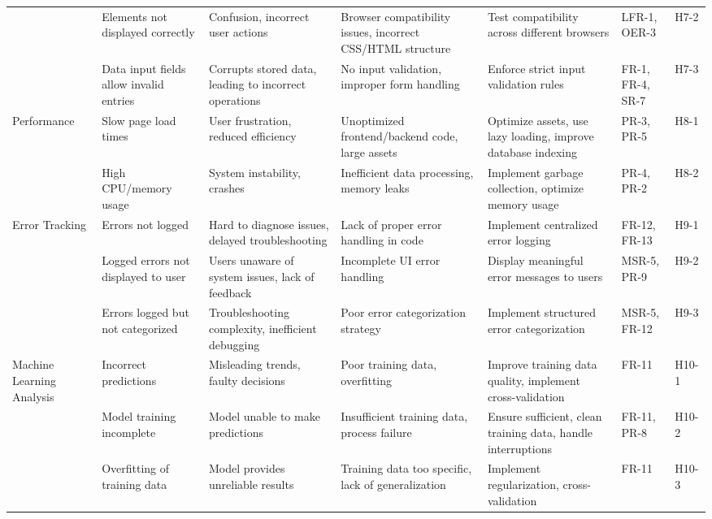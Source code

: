 \documentclass{article}
\begin{document}
\begin{landscape}
\begin{longtable}{|p{2.5cm}|p{4cm}|p{4cm}|p{4cm}|p{4cm}|p{1.25cm}|p{1cm}|}
      \cline{2-7}
      \texttt{} & Elements not displayed correctly & Confusion, incorrect user
      actions & Browser compatibility issues, incorrect CSS/HTML structure &
      Test compatibility across different browsers & LFR-1, OER-3 & H7-2 \\
      \cline{2-7}
      \texttt{} & Data input fields allow invalid entries & Corrupts stored
      data, leading to incorrect operations & No input validation, improper form
      handling & Enforce strict input validation rules & FR-1, FR-4, SR-7 & H7-3
      \\
      \cline{1-7}
      Performance & Slow page load times & User frustration, reduced efficiency
      & Unoptimized frontend/backend code, large assets & Optimize assets, use
      lazy loading, improve database indexing & PR-3, PR-5 & H8-1 \\
      \cline{2-7}
      \texttt{} & High CPU/memory usage & System instability, crashes &
      Inefficient data processing, memory leaks & Implement garbage collection,
      optimize memory usage & PR-4, PR-2 & H8-2 \\
      \cline{1-7}
      Error Tracking & Errors not logged & Hard to diagnose issues, delayed
      troubleshooting & Lack of proper error handling in code & Implement
      centralized error logging & FR-12, FR-13 & H9-1 \\
      \cline{2-7}
      \texttt{} & Logged errors not displayed to user & Users unaware of system
      issues, lack of feedback & Incomplete UI error handling & Display
      meaningful error messages to users & MSR-5, PR-9 & H9-2 \\
      \cline{2-7}
      \texttt{} & Errors logged but not categorized & Troubleshooting
      complexity, inefficient debugging & Poor error categorization strategy &
      Implement structured error categorization & MSR-5, FR-12 & H9-3 \\
      \cline{1-7}
      Machine Learning Analysis & Incorrect predictions & Misleading trends,
      faulty decisions & Poor training data, overfitting & Improve training data
      quality, implement cross-validation & FR-11 & H10-1 \\
      \cline{2-7}
      \texttt{} & Model training incomplete & Model unable to make predictions &
      Insufficient training data, process failure & Ensure sufficient, clean
      training data, handle interruptions & FR-11, PR-8 & H10-2 \\
      \cline{2-7}
      \texttt{} & Overfitting of training data & Model provides unreliable
      results & Training data too specific, lack of generalization & Implement
      regularization, cross-validation & FR-11 & H10-3 \\
  \end{longtable}
\end{landscape}
\end{document}

